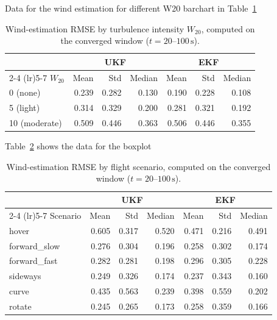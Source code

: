 Data for the wind estimation for different W20 barchart in Table~\ref{tab:w20_conv}
\begin{table}[htbp]
	\centering
	\caption{Wind-estimation RMSE by turbulence intensity $W_{20}$, computed on the converged window ($t = 20$--$100\,\mathrm{s}$).}
	\label{tab:w20_conv}
	\begin{tabular}{lrrrrrr}
		\toprule
		& \multicolumn{3}{c}{UKF} & \multicolumn{3}{c}{EKF} \\
		\cmidrule(lr){2-4} \cmidrule(lr){5-7}
		$W_{20}$ & Mean & Std & Median & Mean & Std & Median \\
		\midrule
		0  (none)     & 0.239 & 0.282 & 0.130 & 0.190 & 0.228 & 0.108 \\
		5  (light)    & 0.314 & 0.329 & 0.200 & 0.281 & 0.321 & 0.192 \\
		10 (moderate) & 0.509 & 0.446 & 0.363 & 0.506 & 0.446 & 0.355 \\
		\bottomrule
	\end{tabular}
\end{table}


Table~\ref{tab:scenario_conv} shows the data for the boxplot
\begin{table}[htbp]
	\centering
	\caption{Wind-estimation RMSE by flight scenario, computed on the converged window ($t = 20$--$100\,\mathrm{s}$).}
	\label{tab:scenario_conv}
	\begin{tabular}{lrrrrrr}
		\toprule
		& \multicolumn{3}{c}{UKF} & \multicolumn{3}{c}{EKF} \\
		\cmidrule(lr){2-4} \cmidrule(lr){5-7}
		Scenario & Mean & Std & Median & Mean & Std & Median \\
		\midrule
		hover         & 0.605 & 0.317 & 0.520 & 0.471 & 0.216 & 0.491 \\
		forward\_slow & 0.276 & 0.304 & 0.196 & 0.258 & 0.302 & 0.174 \\
		forward\_fast & 0.282 & 0.281 & 0.198 & 0.296 & 0.305 & 0.228 \\
		sideways      & 0.249 & 0.326 & 0.174 & 0.237 & 0.343 & 0.160 \\
		curve         & 0.435 & 0.563 & 0.239 & 0.398 & 0.559 & 0.202 \\
		rotate        & 0.245 & 0.265 & 0.173 & 0.258 & 0.359 & 0.166 \\
		\bottomrule
	\end{tabular}
\end{table}
